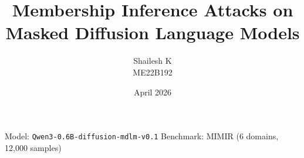 \documentclass[aspectratio=169,10pt]{beamer}
\title[MIA on Masked Diffusion LLMs]{%
  Membership Inference Attacks on\\
  Masked Diffusion Language Models}
\author[Shailesh K \textbar{} ME22B192]{Shailesh K \\ \small ME22B192}
\institute[DA5001]{DA5001 — Privacy in AI}
\date{April 2026}
\newcommand{\code}[1]{\texttt{\small #1}}
\begin{document}

\begin{frame}
  \titlepage
  \vspace{-0.4em}
  \begin{center}
    \small Model: \code{Qwen3-0.6B-diffusion-mdlm-v0.1} \quad
    Benchmark: MIMIR (6 domains, 12{,}000 samples)
  \end{center}
\end{frame}

\end{document}

